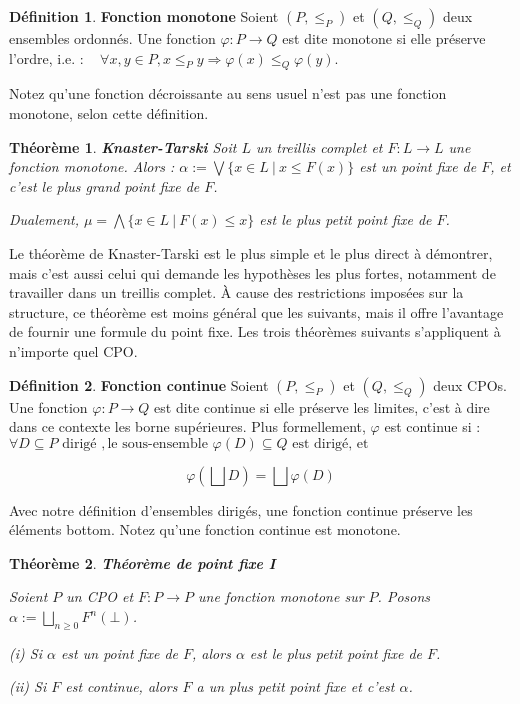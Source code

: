 \documentclass{article}
\newtheorem{theorem}{Théorème}[section]
\theoremstyle{definition}
\newtheorem{definition}{Définition}[section]
\begin{document}
\begin{definition}{\textbf{Fonction monotone}}
Soient $(P, \leq_P)$ et $(Q, \leq_Q)$ deux ensembles ordonnés. Une fonction $\varphi : P \rightarrow Q$ est dite monotone si elle préserve l'ordre, i.e. : ~ $\forall x, y \in P, x \leq_P y \Longrightarrow \varphi(x) \leq_Q \varphi(y)$.

Notez qu'une fonction décroissante au sens usuel n'est pas une fonction monotone, selon cette définition.
\end{definition}

\begin{theorem}{\textbf{Knaster-Tarski}}
Soit $L$ un treillis complet et $F : L \rightarrow L$ une fonction monotone. Alors :
$ \alpha := \bigvee \{x \in L ~|~ x \leq F(x)\}$
est un point fixe de $F$, et c'est le plus grand point fixe de $F$.

\noindent Dualement, $\mu = \bigwedge \{x \in L ~|~ F(x) \leq x\}$ est le plus petit point fixe de $F$.
\end{theorem}

Le théorème de Knaster-Tarski est le plus simple et le plus direct à démontrer, mais c'est aussi celui qui demande les hypothèses les plus fortes, notamment de travailler dans un treillis complet. À cause des restrictions imposées sur la structure, ce théorème est moins général que les suivants, mais il offre l'avantage de fournir une formule du point fixe. Les trois théorèmes suivants s'appliquent à n'importe quel CPO.

\begin{definition}{\textbf{Fonction continue}}
Soient $(P, \leq_P)$ et $(Q, \leq_Q)$ deux CPOs. Une fonction $\varphi : P \rightarrow Q$ est dite continue si elle préserve les limites, c'est à dire dans ce contexte les borne supérieures. Plus formellement, $\varphi$ est continue si :
$\forall D \subseteq P \text{ dirigé }, \text{le sous-ensemble } \varphi(D) \subseteq Q \text{ est dirigé, et }$

$$ \varphi(\bigsqcup D) = \bigsqcup \varphi(D) $$ 

Avec notre définition d'ensembles dirigés, une fonction continue préserve les éléments bottom.
Notez qu'une fonction continue est monotone.
\end{definition}

\begin{theorem}{\textbf{Théorème de point fixe I}}

Soient $P$ un CPO et $F : P \rightarrow P$ une fonction monotone sur $P$. Posons $\alpha := \bigsqcup_{n \geq 0}F^n(\bot)$.

(i) Si $\alpha$ est un point fixe de $F$, alors $\alpha$ est le plus petit point fixe de $F$.

(ii) Si $F$ est continue, alors $F$ a un plus petit point fixe et c'est $\alpha$.

\end{theorem}
\end{document}
